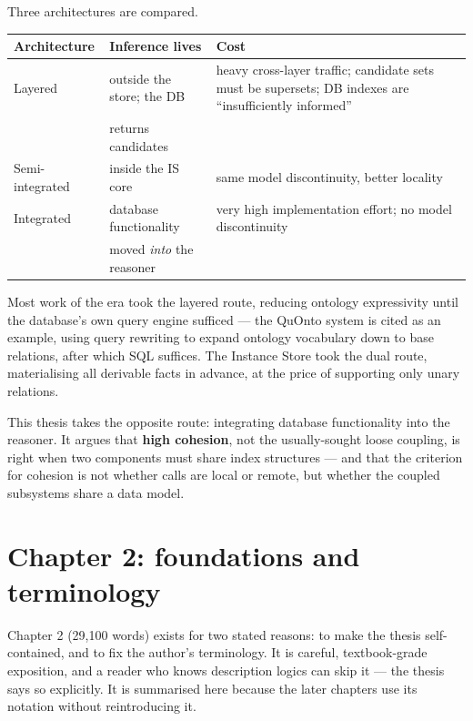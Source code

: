 \documentclass[11pt,a4paper,DIV=12,parskip=half]{scrartcl}
\begin{document}
Three architectures are compared.

\begin{center}
\small
\begin{tabular}{@{}llp{5.4cm}@{}}
\toprule
\textbf{Architecture} & \textbf{Inference lives} & \textbf{Cost} \\
\midrule
Layered & outside the store; the DB
        & heavy cross-layer traffic; candidate sets must be supersets;
          DB indexes are \enquote{insufficiently informed} \\[0.4ex]
        & returns candidates & \\[0.4ex]
Semi-integrated & inside the IS core
        & same model discontinuity, better locality \\[0.4ex]
Integrated & database functionality
        & very high implementation effort; no model discontinuity \\[0.4ex]
        & moved \emph{into} the reasoner & \\
\bottomrule
\end{tabular}
\end{center}

Most work of the era took the layered route, reducing ontology expressivity
until the database's own query engine sufficed --- the QuOnto system is cited as
an example, using query rewriting to expand ontology vocabulary down to base
relations, after which SQL suffices. The Instance Store took the dual route,
materialising all derivable facts in advance, at the price of supporting only
unary relations.

This thesis takes the opposite route: integrating database functionality into
the reasoner. It argues that \textbf{high cohesion}, not the usually-sought
loose coupling, is right when two components must share index structures --- and
that the criterion for cohesion is not whether calls are local or remote, but
whether the coupled subsystems share a data model.

\section{Chapter 2: foundations and terminology}

Chapter 2 (29,100 words) exists for two stated reasons: to make the thesis
self-contained, and to fix the author's terminology. It is careful, textbook-grade
exposition, and a reader who knows description logics can skip it --- the thesis
says so explicitly. It is summarised here because the later chapters use its
notation without reintroducing it.
\end{document}
